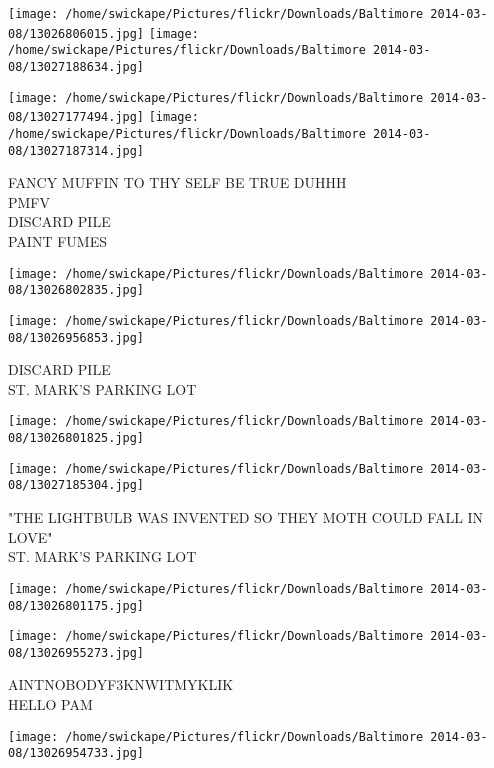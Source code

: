 \documentclass[10pt,letterpaper]{article}
\begin{document}
\texttt{[image: /home/swickape/Pictures/flickr/Downloads/Baltimore 2014-03-08/13026806015.jpg]}
\texttt{[image: /home/swickape/Pictures/flickr/Downloads/Baltimore 2014-03-08/13027188634.jpg]}

\texttt{[image: /home/swickape/Pictures/flickr/Downloads/Baltimore 2014-03-08/13027177494.jpg]}
\texttt{[image: /home/swickape/Pictures/flickr/Downloads/Baltimore 2014-03-08/13027187314.jpg]}

FANCY MUFFIN TO THY SELF BE TRUE DUHHH\\
PMFV\\
DISCARD PILE\\
PAINT FUMES\\
\pagebreak

\texttt{[image: /home/swickape/Pictures/flickr/Downloads/Baltimore 2014-03-08/13026802835.jpg]}

\vspace{0.25in}
\texttt{[image: /home/swickape/Pictures/flickr/Downloads/Baltimore 2014-03-08/13026956853.jpg]}

DISCARD PILE\\
ST. MARK'S PARKING LOT\\
\pagebreak

\texttt{[image: /home/swickape/Pictures/flickr/Downloads/Baltimore 2014-03-08/13026801825.jpg]}

\vspace{0.25in}
\texttt{[image: /home/swickape/Pictures/flickr/Downloads/Baltimore 2014-03-08/13027185304.jpg]}

"THE LIGHTBULB WAS INVENTED SO THEY MOTH COULD FALL IN LOVE"\\
ST. MARK'S PARKING LOT\\
\pagebreak

\texttt{[image: /home/swickape/Pictures/flickr/Downloads/Baltimore 2014-03-08/13026801175.jpg]}

\vspace{0.25in}
\texttt{[image: /home/swickape/Pictures/flickr/Downloads/Baltimore 2014-03-08/13026955273.jpg]}

AINTNOBODYF3KNWITMYKLIK\\
HELLO PAM\\
\pagebreak

\texttt{[image: /home/swickape/Pictures/flickr/Downloads/Baltimore 2014-03-08/13026954733.jpg]}
\end{document}
